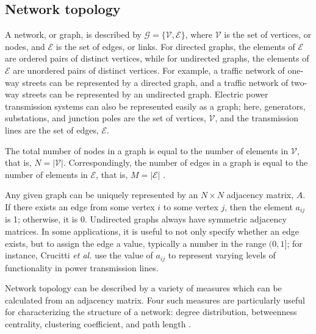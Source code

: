 
\subsection{Network topology}
\label{sec:ch1:networkreliability:networktopology}

A network, or graph, is described by $\mathcal{G}=\{\mathcal{V},\mathcal{E}\}$, where $\mathcal{V}$ is the set of vertices, or nodes, and $\mathcal{E}$ is the set of edges, or links.  For directed graphs, the elements of $\mathcal{E}$ are ordered pairs of distinct vertices, while for undirected graphs, the elements of $\mathcal{E}$ are unordered pairs of distinct vertices. For example, a traffic network of one-way streets can be represented by a directed graph, and a traffic network of two-way streets can be represented by an undirected graph.  Electric power transmission systems can also be represented easily as a graph; here, generators, substations, and junction poles are the set of vertices, $\mathcal{V}$, and the transmission lines are the set of edges, $\mathcal{E}$.

The total number of nodes in a graph is equal to the number of elements in $\mathcal{V}$, that is, $N=|\mathcal{V}|$.  Correspondingly, the number of edges in a graph is equal to the number of elements in $\mathcal{E}$, that is, $M=|\mathcal{E}|$ \cite{Holme2002}.

Any given graph can be uniquely represented by an $N \times N$ adjacency matrix, $A$.  If there exists an edge from some vertex $i$ to some vertex $j$, then the element $a_{ij}$ is 1; otherwise, it is 0.  Undirected graphs always have symmetric adjacency matrices.  In some applications, it is useful to not only specify whether an edge exists, but to assign the edge a value, typically a number in the range $(0,1]$; for instance, Crucitti \emph{et al.} \cite{Crucitti2004a,Crucitti2004b} use the value of $a_{ij}$ to represent varying levels of functionality in power transmission lines.

Network topology can be described by a variety of measures which can be calculated from an adjacency matrix.  Four such measures are particularly useful for characterizing the structure of a network: degree distribution, betweenness centrality, clustering coefficient, and path length \cite{Albert2002}.


